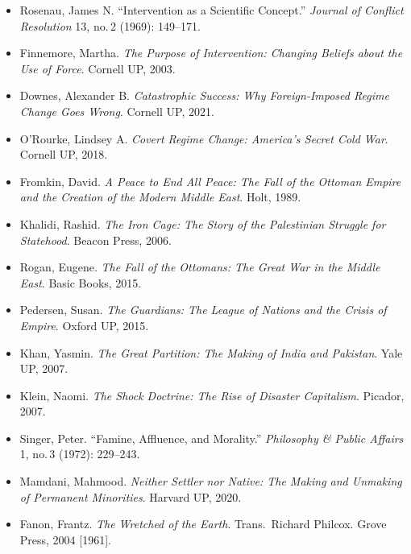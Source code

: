 \begin{itemize}[label={\color{PrimaryMid}\textbullet}]
\item Rosenau, James N. ``Intervention as a Scientific Concept.''
  \textit{Journal of Conflict Resolution} 13, no.\,2 (1969): 149--171.

\item Finnemore, Martha. \textit{The Purpose of Intervention: Changing
  Beliefs about the Use of Force}. Cornell UP, 2003.

\item Downes, Alexander B. \textit{Catastrophic Success: Why
  Foreign-Imposed Regime Change Goes Wrong}. Cornell UP, 2021.

\item O'Rourke, Lindsey A. \textit{Covert Regime Change: America's
  Secret Cold War}. Cornell UP, 2018.

\item Fromkin, David. \textit{A Peace to End All Peace: The Fall of the
  Ottoman Empire and the Creation of the Modern Middle East}. Holt, 1989.

\item Khalidi, Rashid. \textit{The Iron Cage: The Story of the
  Palestinian Struggle for Statehood}. Beacon Press, 2006.

\item Rogan, Eugene. \textit{The Fall of the Ottomans: The Great War in
  the Middle East}. Basic Books, 2015.

\item Pedersen, Susan. \textit{The Guardians: The League of Nations and
  the Crisis of Empire}. Oxford UP, 2015.

\item Khan, Yasmin. \textit{The Great Partition: The Making of India and
  Pakistan}. Yale UP, 2007.

\item Klein, Naomi. \textit{The Shock Doctrine: The Rise of Disaster
  Capitalism}. Picador, 2007.

\item Singer, Peter. ``Famine, Affluence, and Morality.''
  \textit{Philosophy \& Public Affairs} 1, no.\,3 (1972): 229--243.

\item Mamdani, Mahmood. \textit{Neither Settler nor Native: The Making
  and Unmaking of Permanent Minorities}. Harvard UP, 2020.

\item Fanon, Frantz. \textit{The Wretched of the Earth}. Trans.\
  Richard Philcox. Grove Press, 2004 [1961].
\end{itemize}

\cleardoublepage